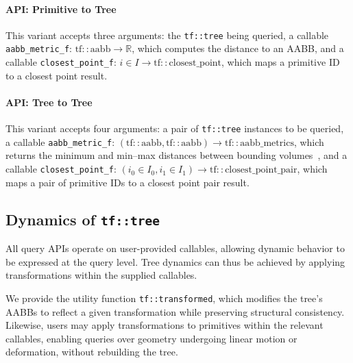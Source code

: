 \paragraph*{API: Primitive to Tree}
This variant accepts three arguments:
the \texttt{tf::tree} being queried,
a callable \texttt{aabb\_metric\_f}:
$\mathrm{tf::aabb} \to \mathbb{R}$,
which computes the distance to an AABB,
and a callable \texttt{closest\_point\_f}:
$i \in I \to \mathrm{tf::closest\_point}$,
which maps a primitive ID to a closest point result.

\paragraph*{API: Tree to Tree}
This variant accepts four arguments:
a pair of \texttt{tf::tree} instances to be queried,
a callable \texttt{aabb\_metric\_f}:
$(\mathrm{tf::aabb}, \mathrm{tf::aabb}) \to \mathrm{tf::aabb\_metrics}$,
which returns the minimum and min–max distances between
bounding volumes~\cite{eknn},
and a callable \texttt{closest\_point\_f}:
$(i_0 \in I_0, i_1 \in I_1) \to \mathrm{tf::closest\_point\_pair}$,
which maps a pair of primitive IDs to a closest point pair result.

\subsection{Dynamics of \texttt{tf::tree}}

All query APIs operate on user-provided callables,
allowing dynamic behavior to be expressed at the query level.
Tree dynamics can thus be achieved by applying
transformations within the supplied callables.

We provide the utility function \texttt{tf::transformed},
which modifies the tree’s AABBs to reflect a given
transformation while preserving structural consistency.
Likewise, users may apply transformations to primitives
within the relevant callables, enabling queries over
geometry undergoing linear motion or deformation,
without rebuilding the tree.

